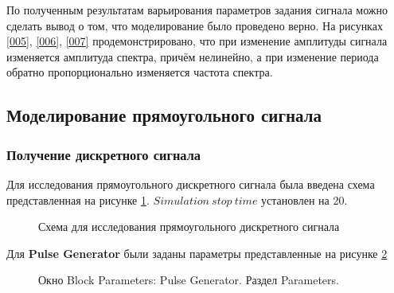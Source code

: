 \documentclass[a4paper,14pt]{extarticle}
\begin{document}
По полученным результатам варьирования параметров задания сигнала можно сделать вывод о том, что моделирование было проведено верно. На рисунках \ref{005}, \ref{006}, \ref{007} продемонстрировано, что при изменение амплитуды сигнала изменяется амплитуда спектра, причём нелинейно, а при изменение периода обратно пропорционально изменяется частота спектра.

\subsection{Моделирование прямоугольного сигнала}

\subsubsection{Получение дискретного сигнала}

Для исследования прямоугольного дискретного сигнала была введена схема представленная на рисунке \ref{008}. $Simulation \ stop \ time$ установлен на 20.

\begin{figure}[H]
\caption{Схема для исследования прямоугольного дискретного сигнала}
\label{008}
\end{figure}

Для \textbf{Pulse Generator} были заданы параметры представленные на рисунке \ref{009}

\begin{figure}[H]
\caption{Окно Block Parameters: Pulse Generator. Раздел Parameters.}
\label{009}
\end{figure}
\end{document}
